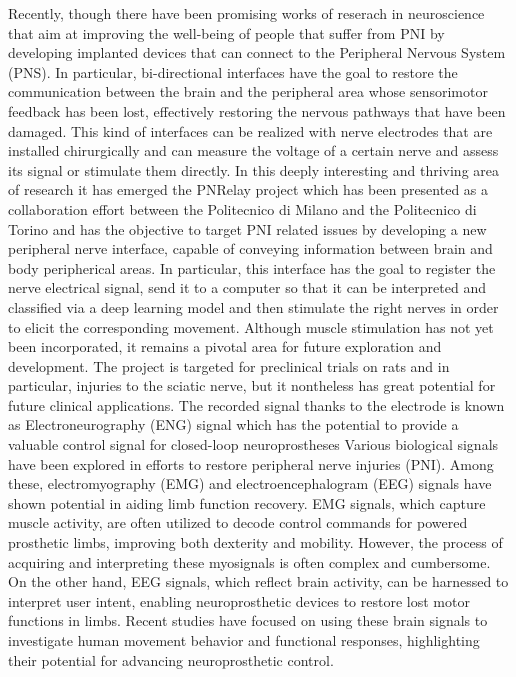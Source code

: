 \documentclass{Configuration_Files/PoliMi3i_thesis}
\begin{document}
Recently, though there have been promising works of reserach in neuroscience that aim at improving the well-being of people that suffer from PNI by developing implanted devices that can connect to the Peripheral Nervous System (PNS).
In particular, bi-directional interfaces have the goal to restore the communication between the brain and the peripheral area whose sensorimotor feedback has been lost, effectively restoring the nervous pathways that have been damaged.
This kind of interfaces can be realized with nerve electrodes that are installed chirurgically and can measure the voltage of a certain nerve and assess its signal or stimulate them directly.
In this deeply interesting and thriving area of research it has emerged the PNRelay project 
which has been presented as a collaboration effort between the Politecnico di Milano and the Politecnico di Torino and has the objective to target PNI related issues by developing a new peripheral nerve interface, capable of conveying information between brain and body peripherical areas.
In particular, this interface has the goal to register the nerve electrical signal, send it to a computer so that it can be interpreted and classified via a deep learning model and then stimulate the right nerves in order to elicit the corresponding movement.
Although muscle stimulation has not yet been incorporated, it remains a pivotal area for future exploration and development.
The project is targeted for preclinical trials on rats and in particular, injuries to the sciatic nerve, but it nontheless has great potential for future clinical applications.
The recorded signal thanks to the electrode is known as  Electroneurography (ENG) signal
which has the potential to provide a valuable control signal for closed-loop neuroprostheses \cite{tesiDavide5} \cite{tesiDavide}
Various biological signals have been explored in efforts to restore peripheral nerve injuries (PNI). Among these, electromyography (EMG) and electroencephalogram (EEG) signals have shown potential in aiding limb function recovery. EMG signals, which capture muscle activity, are often utilized to decode control commands for powered prosthetic limbs, improving both dexterity and mobility. However, the process of acquiring and interpreting these myosignals is often complex and cumbersome. On the other hand, EEG signals, which reflect brain activity, can be harnessed to interpret user intent, enabling neuroprosthetic devices to restore lost motor functions in limbs. Recent studies have focused on using these brain signals to investigate human movement behavior and functional responses, highlighting their potential for advancing neuroprosthetic control. \cite{tesiDavide12} \cite{tesiDavide}
\end{document}
